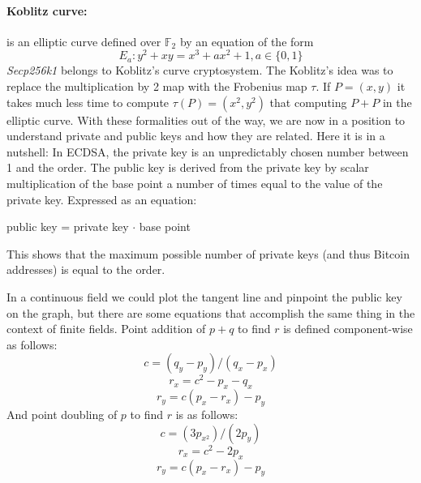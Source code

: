 \documentclass{article}
\begin{document}
\paragraph*{Koblitz curve:} is an elliptic curve defined over \(\mathbb{F}_{2}\) by an equation of the form
\[E_a : y^2 + xy = x^3 + ax^2 + 1, a \in \{0,1\}\]
\textit{Secp256k1} belongs to Koblitz’s curve cryptosystem. The Koblitz’s idea was to replace the multiplication by 2 map with the Frobenius map \(\tau\). If \(P = (x, y)\) it takes much less time to compute \(\tau(P) = (x^2, y^2)\) that computing \(P + P\) in the elliptic curve.\newline
With these formalities out of the way, we are now in a position to understand private and public keys and how they are related. Here it is in a nutshell: In ECDSA, the private key is an unpredictably chosen number between 1 and the order. The public key is derived from the private key by scalar multiplication of the base point a number of times equal to the value of the private key. Expressed as an equation:\newline\newline
\centerline{public key = private key \(\cdot\) base point}\newline\newline
This shows that the maximum possible number of private keys (and thus Bitcoin addresses) is equal to the order.\par
\noindent In a continuous field we could plot the tangent line and pinpoint the public key on the graph, but there are some equations that accomplish the same thing in the context of finite fields. Point addition of \(p + q\) to find \(r\) is defined component-wise as follows:
\[c = (q_y - p_y)/(q_x - p_x)\]
\[r_x = c^2 - p_x - q_x\]
\[r_y = c(p_x - r_x) - p_y\]
And point doubling of \(p\) to find \(r\) is as follows:
\[c = (3p_{x^2} )/(2p_y)\]
\[r_x = c^2 - 2p_x\]
\[r_y = c(p_x - r_x) - p_y\]
\end{document}
